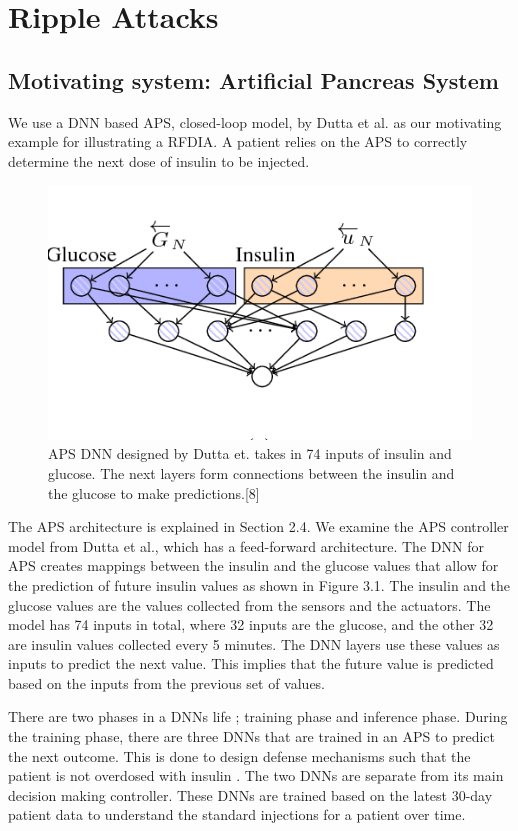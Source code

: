 \chapter{Ripple Attacks}
\label{attack}

\section{Motivating system: Artificial Pancreas System}

We use a DNN based \ac{APS}, closed-loop model, by Dutta et al. \cite{10.1007/978-3-319-99429-1_11}  as our motivating example for illustrating a \ac{RFDIA}. 
A patient relies on  the APS to correctly determine the next dose of insulin to be injected. 

\begin{figure}
	\centering
	\includegraphics[width=0.7\linewidth, height=0.3\linewidth]{Images/APSDNN}
	\caption[APS DNN]{APS DNN designed by Dutta et. takes in 74 inputs of insulin and glucose. The next layers form connections between the insulin and the glucose to make predictions.[8]}
	\label{fig:apsdnn}
\end{figure}

The APS architecture is explained in Section 2.4. 
We examine the \ac{APS} controller model from Dutta et al., which has a feed-forward architecture. 
The DNN for APS creates mappings between the insulin and the glucose values that allow for the prediction of future insulin values as shown in Figure 3.1. 
The insulin and the glucose values are the values collected from the sensors and the actuators. 
The model has 74 inputs in total, where 32 inputs are the glucose, and the other 32  are insulin values collected every 5 minutes.
 The DNN layers use these values as inputs to predict the next value. 
 This implies that the future value is predicted based on the inputs from the previous set of values. 


There are two phases in a \ac{DNN}s life ; training phase and inference phase. 
During the training phase, there are three \ac{DNN}s that are trained in an \ac{APS} to predict the next outcome. 
This is done to design defense mechanisms such that the patient is not overdosed with insulin .  
The two \ac{DNN}s are separate from its main decision making controller. 
These \ac{DNN}s are trained based on the latest 30-day patient data to understand the standard injections for a patient over time. 

